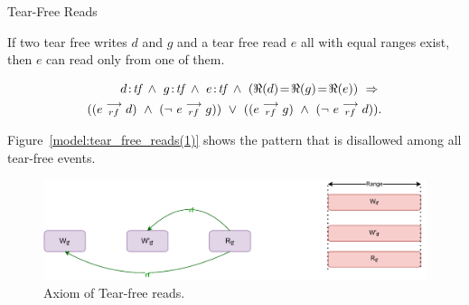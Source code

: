 
        \begin{axiom}{Tear-Free Reads} 
            \label{TfRe}

            If two tear free writes $d$ and $g$ and a tear free read $e$ all with equal ranges exist, then $e$ can read only from one of them\footnotemark.
                
            \begin{align*}
                \et{d}{tf}\ \wedge\ \et{g}{tf} \ \wedge \ \et{e}{tf} 
                  \ \wedge \ 
                  (\Re(d) \!=\! \Re(g) \!=\! \Re(e)) 
                  \ \Rightarrow{} \\ 
                      ((\reln{e}{rf}{d}) 
                      \ \wedge \ 
                      (\neg \ \reln{e}{rf}{g})) 
                  \ \vee \  
                      ((\reln{e}{rf}{g}) 
                      \ \wedge \
                      (\neg \ \reln{e}{rf}{d})).
            \end{align*}
                    
            Figure~\ref{model:tear_free_reads(1)} shows the pattern that is disallowed among all tear-free events. 
            \begin{figure}[H]
                \centering
                \includegraphics[scale=0.7]{4.ECMAScriptMemoryModel/TearFreeReads.pdf}
                \caption{Axiom of Tear-free reads.}
                \label{model:tear_free_reads}
            \end{figure}

        \end{axiom}

